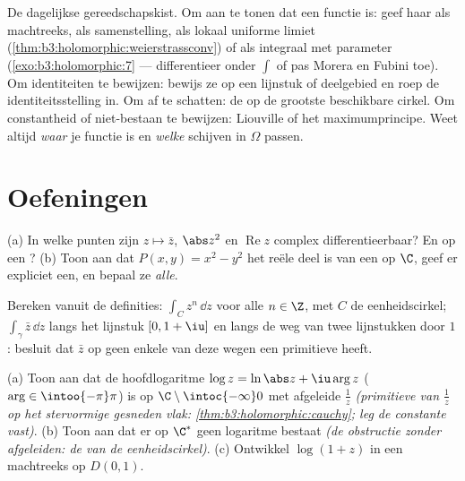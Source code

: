 \begin{method}\label{met:b3:holomorphic:toolkit}
De dagelijkse gereedschapskist. Om aan te tonen dat een functie
 is: geef haar als machtreeks, als samenstelling, als
lokaal uniforme limiet
(\cref{thm:b3:holomorphic:weierstrassconv}) of als integraal met
 parameter (\cref{exo:b3:holomorphic:7} ---
differentieer onder $\int$ of pas Morera en Fubini toe). Om
identiteiten te bewijzen: bewijs ze op een lijnstuk of
deelgebied en roep de identiteitsstelling in. Om af te schatten:
de  op de grootste beschikbare cirkel. Om
constantheid of niet-bestaan te bewijzen: Liouville of het
maximumprincipe. Weet altijd \emph{waar} je functie  is
en \emph{welke} schijven in $\Omega$ passen.
\end{method}

\section{Oefeningen}

\begin{exercise}[$\star$]\label{exo:b3:holomorphic:1}
(a) In welke punten zijn $z \mapsto \bar z$, $\abs z^2$ en
$\operatorname{Re}z$ complex differentieerbaar? En  op
een ?
(b) Toon aan dat $P(x, y) = x^2 - y^2$ het reële deel is van een
 op $\C$, geef er expliciet een, en bepaal ze
\emph{alle}.
\end{exercise}

\begin{exercise}[$\star$]\label{exo:b3:holomorphic:2}
Bereken vanuit de definities: $\int_{C}z^n\,\dd z$ voor alle $n
\in \Z$, met $C$ de eenheidscirkel; $\int_\gamma\bar z\,\dd z$
langs het lijnstuk $[0, 1+\iu]$ en langs de weg van twee
lijnstukken door $1$: besluit dat $\bar z$ op geen enkele
 van deze wegen een primitieve heeft.
\end{exercise}

\begin{exercise}[$\star\star$]\label{exo:b3:holomorphic:3}
(a) Toon aan dat de hoofdlogaritme $\log z = \ln\abs z + \iu\arg
z$ ($\arg \in \intoo{-\pi}\pi$)  is op
$\C\setminus\intoc{-\infty}0$ met afgeleide $\frac1z$
\emph{(primitieve van $\frac1z$ op het stervormige gesneden vlak:
\cref{thm:b3:holomorphic:cauchy}; leg de constante vast)}.
(b) Toon aan dat er op $\C^*$ geen  logaritme bestaat
\emph{(de obstructie zonder afgeleiden: de  van de
eenheidscirkel)}.
(c) Ontwikkel $\log(1 + z)$ in een machtreeks op $D(0,1)$.
\end{exercise}

